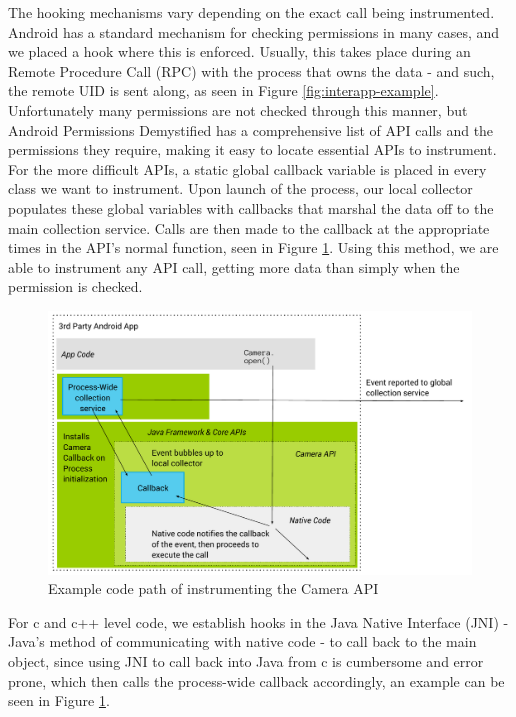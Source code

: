 The hooking mechanisms vary depending on the exact call being instrumented. Android has a standard mechanism for checking permissions in many cases, and we placed a hook where this is enforced. Usually, this takes place during an Remote Procedure Call (RPC) with the process that owns the data - and such, the remote UID is sent along, as seen in Figure \ref{fig:interapp-example}. Unfortunately many permissions are not checked through this manner, but Android Permissions Demystified\citep{felt2011android} has a comprehensive list of API calls and the permissions they require, making it easy to locate essential APIs to instrument. For the more difficult APIs, a static global callback variable is placed in every class we want to instrument. Upon launch of the process, our local collector populates these global variables with callbacks that marshal the data off to the main collection service. Calls are then made to the callback at the appropriate times in the API's normal function, seen in Figure \ref{fig:camera-example}. Using this method, we are able to instrument any API call, getting more data than simply when the permission is checked.

\begin{figure}[t]
\begin{center}
\includegraphics[width=1.0\columnwidth]{figs/AndroMEDA-Static-Example}
\caption{Example code path of instrumenting the Camera API}
\label{fig:camera-example}
\end{center}
\end{figure}

For c and c++ level code, we establish hooks in the Java Native Interface (JNI) - Java's method of communicating with native code - to call back to the main object, since using JNI to call back into Java from c is cumbersome and error prone, which then calls the process-wide callback accordingly, an example can be seen in Figure \ref{fig:camera-example}.

